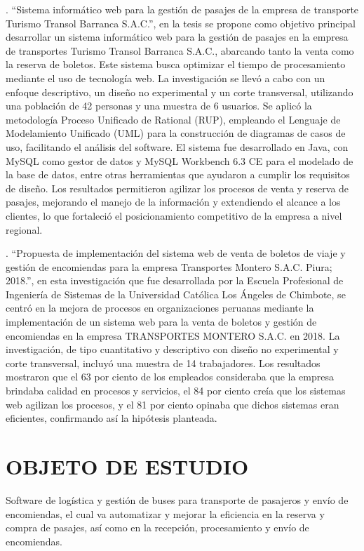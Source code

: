 \documentclass[12pt,letterpaper]{article}
\begin{document}
\textcite{sosa2019sistema}. ``Sistema informático web para la gestión de pasajes de la empresa de transporte Turismo Transol Barranca S.A.C.'', en la tesis se propone como objetivo principal desarrollar un sistema informático web para la gestión de pasajes en la empresa de transportes Turismo Transol Barranca S.A.C., abarcando tanto la venta como la reserva de boletos. Este sistema busca optimizar el tiempo de procesamiento mediante el uso de tecnología web. La investigación se llevó a cabo con un enfoque descriptivo, un diseño no experimental y un corte transversal, utilizando una población de 42 personas y una muestra de 6 usuarios. Se aplicó la metodología Proceso Unificado de Rational (RUP), empleando el Lenguaje de Modelamiento Unificado (UML) para la construcción de diagramas de casos de uso, facilitando el análisis del software. El sistema fue desarrollado en Java, con MySQL como gestor de datos y MySQL Workbench 6.3 CE para el modelado de la base de datos, entre otras herramientas que ayudaron a cumplir los requisitos de diseño. Los resultados permitieron agilizar los procesos de venta y reserva de pasajes, mejorando el manejo de la información y extendiendo el alcance a los clientes, lo que fortaleció el posicionamiento competitivo de la empresa a nivel regional.

\textcite{vivas2019propuesta}. ``Propuesta de implementación del sistema web de venta de boletos de viaje y gestión de encomiendas para la empresa Transportes Montero S.A.C. Piura; 2018.'', en esta investigación que fue desarrollada por la Escuela Profesional de Ingeniería de Sistemas de la Universidad Católica Los Ángeles de Chimbote, se centró en la mejora de procesos en organizaciones peruanas mediante la implementación de un sistema web para la venta de boletos y gestión de encomiendas en la empresa TRANSPORTES MONTERO S.A.C. en 2018. La investigación, de tipo cuantitativo y descriptivo con diseño no experimental y corte transversal, incluyó una muestra de 14 trabajadores. Los resultados mostraron que el 63 por ciento de los empleados consideraba que la empresa brindaba calidad en procesos y servicios, el 84 por ciento creía que los sistemas web agilizan los procesos, y el 81 por ciento opinaba que dichos sistemas eran eficientes, confirmando así la hipótesis planteada.

\section{OBJETO DE ESTUDIO}

Software de logística y gestión de buses para transporte de pasajeros y envío de encomiendas, el cual va automatizar y mejorar la eficiencia en la reserva y compra de pasajes, así como en la recepción, procesamiento y envío de encomiendas.
\end{document}
